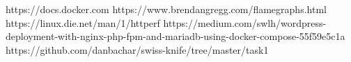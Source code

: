 
\begin{thebibliography}{99}  
https://docs.docker.com
https://www.brendangregg.com/flamegraphs.html
https://linux.die.net/man/1/httperf
https://medium.com/swlh/wordpress-deployment-with-nginx-php-fpm-and-mariadb-using-docker-compose-55f59e5c1a
https://github.com/danbachar/swiss-knife/tree/master/task1
\end{thebibliography}


